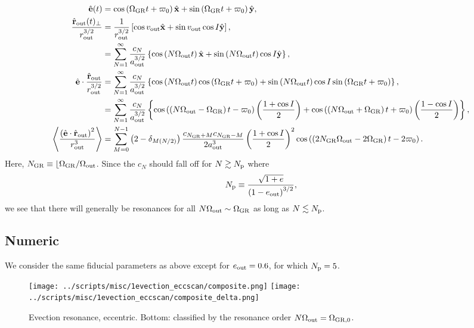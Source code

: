 \documentclass[11pt,
        usenames, %
        dvipsnames %
    ]{article}
\newcommand*{\bm}[1]{\boldsymbol{\mathbf{#1}}}
\newcommand*{\uv}[1]{\hat{\bm{#1}}}
\newcommand*{\ev}[1]{\left\langle#1\right\rangle}
\newcommand*{\p}[1]{\left(#1\right)}
\newcommand*{\s}[1]{\left[#1\right]}
\newcommand*{\z}[1]{\left\{#1\right\}}
\begin{document}
\begin{align}
    \uv{e}(t) &= \cos \p{\Omega_{\rm GR}t + \varpi_0} \uv{x} +
        \sin\p{\Omega_{\rm GR}t + \varpi_0}\uv{y},\\
    \frac{\uv{r}_{\rm out}(t)_{\perp}}{r_{\rm out}^{3/2}} &=
        \frac{1}{r_{\rm out}^{3/2}}\s{\cos v_{\rm out}
            \uv{x} + \sin v_{\rm out}\cos I \uv{y}},\\
        &= \sum\limits_{N = 1}^\infty
            \frac{c_N}{a_{\rm out}^{3/2}}\z{\cos\p{N \Omega_{\rm out}t} \uv{x}
            + \sin\p{N \Omega_{\rm out}t} \cos I\uv{y}},\\
    \uv{e} \cdot \frac{\uv{r}_{\rm out}}{r_{\rm out}^{3/2}}
        &= \sum\limits_{N = 1}^\infty
            \frac{c_N}{a_{\rm out}^{3/2}}
                \z{\cos\p{N \Omega_{\rm out}t} \cos\p{\Omega_{\rm GR}t +
                    \varpi_0}
            + \sin\p{N \Omega_{\rm out}t} \cos I \sin\p{\Omega_{\rm GR}t +
                \varpi_0}},\\
        &= \sum\limits_{N = 1}^\infty
            \frac{c_N}{a_{\rm out}^{3/2}}
                \z{
                    \cos\p{\p{N\Omega_{\rm out} - \Omega_{\rm GR}}t - \varpi_0}
                        \p{\frac{1 + \cos I}{2}}
                    + \cos\p{\p{N\Omega_{\rm out} + \Omega_{\rm GR}}t + \varpi_0}
                        \p{\frac{1 - \cos I}{2}}
                    },\\
    \ev{\frac{\p{\uv{e} \cdot \uv{r}_{\rm out}}^2}{r_{\rm out}^3}}
        &= \sum\limits_{M = 0}^{N - 1}
            \p{2 - \delta_{M(N/2)}}
            \frac{c_{N_{\rm GR} + M}c_{N_{\rm GR} - M}}{2a_{\rm out}^3}
            \p{\frac{1 + \cos I}{2}}^2 \cos\p{\p{2N_{\rm GR}\Omega_{\rm out}
                - 2\Omega_{\rm GR}}t - 2\varpi_0}.
\end{align}
Here, $N_{\rm GR} \equiv \lfloor \Omega_{\rm GR} / \Omega_{\rm out}$. Since the
$c_N$ should fall off for $N \gtrsim N_{\rm p}$ where
\begin{equation}
    N_{\rm p} \equiv \frac{\sqrt{1 + e}}{\p{1 - e_{\rm out}}^{3/2}},
\end{equation}
we see that there will generally be resonances for all $N\Omega_{\rm out} \sim
\Omega_{\rm GR}$ as long as $N \lesssim N_{\rm p}$.

\subsection{Numeric}

We consider the same fiducial parameters as above except for $e_{\rm out} =
0.6$, for which $N_{\rm p} = 5$.
\begin{figure}[h]
    \centering
    \texttt{[image: ../scripts/misc/1evection\_eccscan/composite.png]}
    \texttt{[image: ../scripts/misc/1evection\_eccscan/composite\_delta.png]}
    \caption{Evection resonance, eccentric. Bottom: classified by the resonance
    order $N\Omega_{\rm out} = \Omega_{\rm GR, 0}$.}\label{fig:eccentric_composite}
\end{figure}
\end{document}
